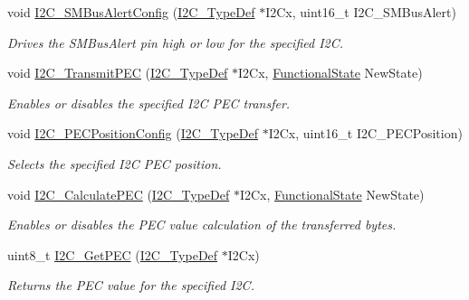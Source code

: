\begin{DoxyCompactItemize}
void \hyperlink{group___i2_c___private___functions_ga75a810776d9710d2f6d9c5d9e93241c6}{I2\+C\+\_\+\+S\+M\+Bus\+Alert\+Config} (\hyperlink{struct_i2_c___type_def}{I2\+C\+\_\+\+Type\+Def} $\ast$I2\+Cx, uint16\+\_\+t I2\+C\+\_\+\+S\+M\+Bus\+Alert)
\begin{DoxyCompactList}\small\item\em Drives the S\+M\+Bus\+Alert pin high or low for the specified I2C. \end{DoxyCompactList}\item 
void \hyperlink{group___i2_c___private___functions_gaa27d1440290fe601e730b6980999afe3}{I2\+C\+\_\+\+Transmit\+P\+EC} (\hyperlink{struct_i2_c___type_def}{I2\+C\+\_\+\+Type\+Def} $\ast$I2\+Cx, \hyperlink{group___exported__types_gac9a7e9a35d2513ec15c3b537aaa4fba1}{Functional\+State} New\+State)
\begin{DoxyCompactList}\small\item\em Enables or disables the specified I2C P\+EC transfer. \end{DoxyCompactList}\item 
void \hyperlink{group___i2_c___private___functions_ga5d0f939bdd45542502827bf408f24161}{I2\+C\+\_\+\+P\+E\+C\+Position\+Config} (\hyperlink{struct_i2_c___type_def}{I2\+C\+\_\+\+Type\+Def} $\ast$I2\+Cx, uint16\+\_\+t I2\+C\+\_\+\+P\+E\+C\+Position)
\begin{DoxyCompactList}\small\item\em Selects the specified I2C P\+EC position. \end{DoxyCompactList}\item 
void \hyperlink{group___i2_c___private___functions_gae86801251359226c35745e0a258388b0}{I2\+C\+\_\+\+Calculate\+P\+EC} (\hyperlink{struct_i2_c___type_def}{I2\+C\+\_\+\+Type\+Def} $\ast$I2\+Cx, \hyperlink{group___exported__types_gac9a7e9a35d2513ec15c3b537aaa4fba1}{Functional\+State} New\+State)
\begin{DoxyCompactList}\small\item\em Enables or disables the P\+EC value calculation of the transferred bytes. \end{DoxyCompactList}\item 
uint8\+\_\+t \hyperlink{group___i2_c___private___functions_ga7bf75e7c27c0e1d73e70fc0e1c7cd1dd}{I2\+C\+\_\+\+Get\+P\+EC} (\hyperlink{struct_i2_c___type_def}{I2\+C\+\_\+\+Type\+Def} $\ast$I2\+Cx)
\begin{DoxyCompactList}\small\item\em Returns the P\+EC value for the specified I2C. \end{DoxyCompactList}\item 

\end{DoxyCompactItemize}
